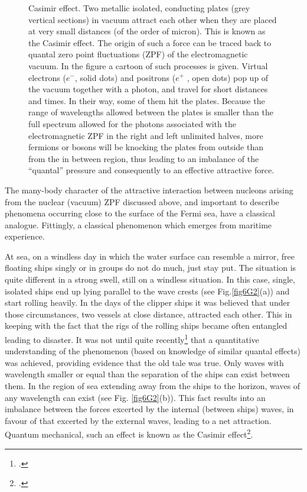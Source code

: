 \begin{subappendices}
\begin{figure}
\caption{Casimir effect. Two metallic isolated, conducting plates (grey vertical sections) in vacuum attract
each other when they are placed at very small distances (of the order of micron). This is known as the
Casimir effect. The origin of such a force can be traced back to quantal zero point fluctuations (ZPF) of the electromagnetic vacuum. In
the figure a cartoon of such processes is given. Virtual electrons ($e^-$, solid dots) and positrons ($e^+$ , open
dots) pop up of the vacuum together with a photon, and travel for short distances and times. In their
way, some of them hit the plates. Because the range of wavelengths allowed between
the plates is smaller than the full spectrum allowed for
the photons associated with the electromagnetic ZPF in the right and left unlimited halves, more fermions
or bosons will be knocking the plates from outside than from the in between region, thus leading to an imbalance of
the ``quantal'' pressure and consequently to an effective attractive force.}\label{fig6G3}
\end{figure}
The many-body character of the attractive interaction between nucleons arising from the nuclear (vacuum) ZPF discussed above, and important to describe phenomena occurring close to the surface of the Fermi sea, have a classical analogue. Fittingly, a classical phenomenon which emerges from maritime experience. 


At sea, on a windless day in which the water surface can resemble a mirror, free floating
ships singly or in groups do not do much, just stay put. The situation is quite different
in a strong swell, still on a windless situation. In this case, single, isolated ships end up
lying parallel to the wave crests (see Fig.\ref{fig6G2}(a)) and start rolling heavily. In the days
of the clipper ships it was believed that under those circumstances, two vessels at close
distance, attracted each other. This in keeping with the fact that the rigs of the rolling
ships became often entangled leading to disaster. It was not until quite recently\footnote{\cite{Boersma:96}.}
that a quantitative understanding of the phenomenon (based on knowledge of similar quantal
effects) was achieved, providing evidence that the old tale was true.
Only waves with wavelength smaller or equal than the separation of the ships can exist between
them. In the region of sea extending away from the ships to the horizon, waves of any
wavelength can exist (see Fig. \ref{fig6G2}(b)). This fact results into an imbalance between the
forces excerted by the internal (between ships) waves, in favour of that excerted by the
external waves, leading to a net attraction.
Quantum mechanical, such an effect is known as the Casimir effect\footnote{\cite{Casimir:48}.}. 



\end{subappendices}
